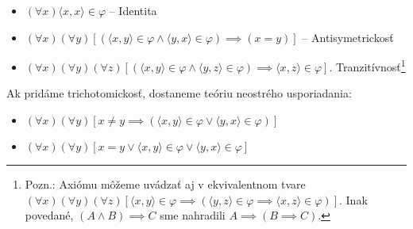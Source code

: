 \begin{priklad}
\noindent
    \begin{itemize}
        \item[1.] $(\forall x) \langle x,x\rangle \in \varphi$ -- Identita

        \item[2.] $(\forall x) (\forall y) [
            (\langle x,y \rangle \in \varphi \land
             \langle y,x \rangle \in \varphi) \implies (x=y)]$ -- 
             Antisymetrickosť

        \item[3.] $(\forall x) (\forall y) (\forall z)
            [( \langle x,y \rangle \in \varphi \land 
               \langle y,z \rangle \in \varphi) \implies
               \langle x,z \rangle \in \varphi]$.
               Tranzitívnosť\footnote{Pozn.: Axiómu môžeme uvádzať aj
               v ekvivalentnom tvare
                $(\forall x) (\forall y) (\forall z)
                [ \langle x,y \rangle \in \varphi \implies (
                    \langle y,z \rangle \in \varphi \implies
                    \langle x,z \rangle \in \varphi)]$. Inak povedané,
                    $(A \land B) \implies C$ sme nahradili
                    $A \implies (B \implies C)$.
               }
    \end{itemize}
    Ak pridáme trichotomickosť, dostaneme teóriu neostrého
    usporiadania:
    \begin{itemize}
        \item[4.] $(\forall x) (\forall y) [x \not=y \implies
            (\langle x,y \rangle \in \varphi \lor 
             \langle y,x \rangle \in \varphi)]$

        \item[4'] $(\forall x) (\forall y) [x = y \lor
             \langle x,y \rangle \in \varphi \lor 
             \langle y,x \rangle \in \varphi]$
    \end{itemize}
\end{priklad}

